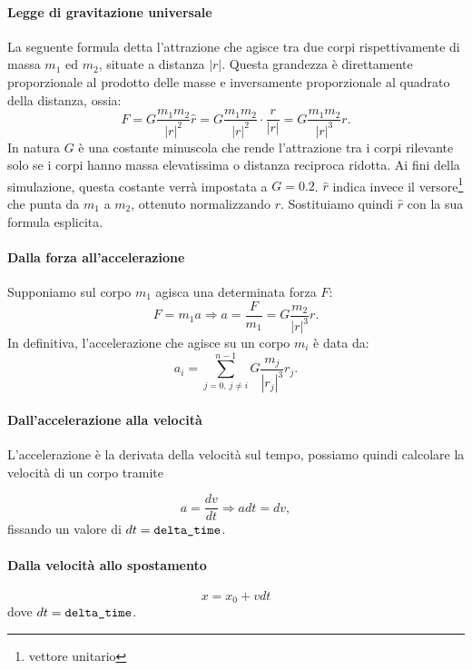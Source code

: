 \documentclass{article}
\begin{document}
	\paragraph{Legge di gravitazione universale} La seguente formula detta l'attrazione che agisce tra due corpi rispettivamente di massa $m_1$ ed $m_2$, situate a distanza $|r|$. Questa grandezza è direttamente proporzionale al prodotto delle masse e inversamente proporzionale al quadrato della distanza, ossia:
	\begin{equation}
	F = G \frac{m_1m_2}{|r|^2} \hat r = G \frac{m_1m_2}{|r|^2} \cdot \frac{r}{|r|} = G \frac{m_1m_2}{|r|^3} r.
	\end{equation}
	In natura $G$ è una costante minuscola che rende l'attrazione tra i corpi rilevante solo se i corpi hanno massa elevatissima o distanza reciproca ridotta. Ai fini della simulazione, questa costante verrà impostata a $G=0.2$. $\hat r$ indica invece il versore\footnote{vettore unitario} che punta da $m_1$ a $m_2$, ottenuto normalizzando $r$. Sostituiamo quindi $\hat r$ con la sua formula esplicita.
	\paragraph{Dalla forza all'accelerazione}
	Supponiamo sul corpo $m_1$ agisca una determinata forza $F$:
	\begin{equation}
	F = m_1 a \Rightarrow a = \frac{F}{m_1} = G \frac{m_2}{|r|^3} r.
	\end{equation}
	In definitiva, l'accelerazione che agisce su un corpo $m_i$ è data da:
	\begin{equation}
	a_i = \sum_{j=0,\, j \neq i}^{n-1} G \frac{m_j}{|r_j|^3} r_j.
	\end{equation}
	\paragraph{Dall'accelerazione alla velocità} L'accelerazione è la derivata della velocità sul tempo, possiamo quindi calcolare la velocità di un corpo tramite
	
	\begin{equation}
	a = \frac{dv}{dt} \Rightarrow adt = dv,
	\end{equation}
	fissando un valore di $dt = \verb*|delta_time|$.
	
	\paragraph{Dalla velocità allo spostamento}
	\begin{equation}
	x = x_0 + v dt
	\end{equation}
	dove $dt = \verb*|delta_time|$.
	
\end{document}
